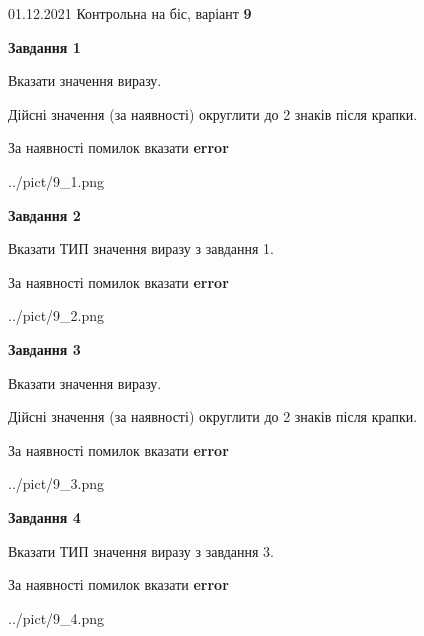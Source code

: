 \documentclass[11pt, ukrainian]{article}
\begin{document}
{01.12.2021 Контрольна на біс, варіант  \No \textbf { 9 }\par}
{
\begin {large}
{\begin {center}\textbf{Завдання 1}\end {center}}\par
Вказати значення виразу. \par
Дійсні значення (за наявності) округлити до 2 знаків після крапки. \par
За наявності помилок вказати \textbf{error}

\begin{center}
	{../pict/9_1.png}
\end{center}
\newpage

{\begin {center}\textbf{Завдання 2}\end {center}}\par
Вказати ТИП значення виразу з завдання 1. \par
За наявності помилок вказати \textbf{error}

\begin{center}
	{../pict/9_2.png}
\end{center}
\newpage

{\begin {center}\textbf{Завдання 3}\end {center}}\par
Вказати значення виразу. \par
Дійсні значення (за наявності) округлити до 2 знаків після крапки. \par
За наявності помилок вказати \textbf{error}

\begin{center}
	{../pict/9_3.png}
\end{center}
\newpage

{\begin {center}\textbf{Завдання 4}\end {center}}\par
Вказати ТИП значення виразу з завдання 3. \par
За наявності помилок вказати \textbf{error}

\begin{center}
	{../pict/9_4.png}
\end{center}
\newpage


\end{large}}
\end{document}
